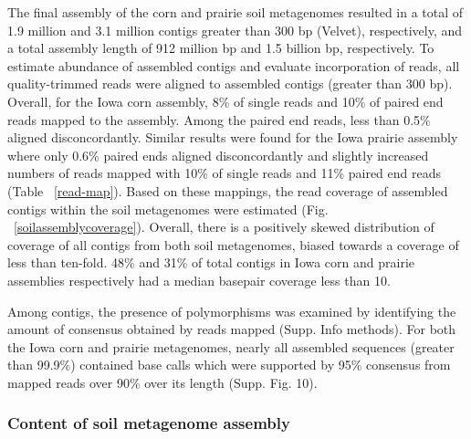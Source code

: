 \documentclass[11pt]{article} %
\begin{document}
The final assembly of the corn and prairie soil metagenomes resulted
in a total of 1.9 million and 3.1 million contigs greater than 300 bp (Velvet),
respectively, and a total assembly length of 912 million bp and 1.5
billion bp, respectively.  To estimate abundance of assembled contigs
and evaluate incorporation of reads, all quality-trimmed reads were
aligned to assembled contigs (greater than 300 bp).  Overall, for the
Iowa corn assembly, 8\% of single reads and 10\% of paired end reads
mapped to the assembly.  Among the paired end reads, less than 0.5\%
aligned disconcordantly.  Similar results were found for the Iowa
prairie assembly where only 0.6\% paired ends aligned disconcordantly
and slightly increased numbers of reads mapped with 10\% of single
reads and 11\% paired end reads (Table ~\ref{read-map}).  Based on
these mappings, the read coverage of assembled contigs within the soil
metagenomes were estimated (Fig. ~\ref{soilassemblycoverage}).
Overall, there is a positively skewed distribution of coverage of all
contigs from both soil metagenomes, biased towards a coverage of less
than ten-fold.  48\% and 31\% of total contigs in Iowa corn and prairie
assemblies respectively had a median basepair coverage less than
10.

Among contigs, the presence of polymorphisms was examined by
identifying the amount of consensus obtained by reads mapped
(Supp. Info methods).  For both the Iowa corn and prairie metagenomes,
nearly all assembled sequences (greater than 99.9\%) contained base
calls which were supported by 95\% consensus from mapped reads over
90\% over its length (Supp. Fig. 10).



\subsubsection{Content of soil metagenome assembly}

\end{document}

